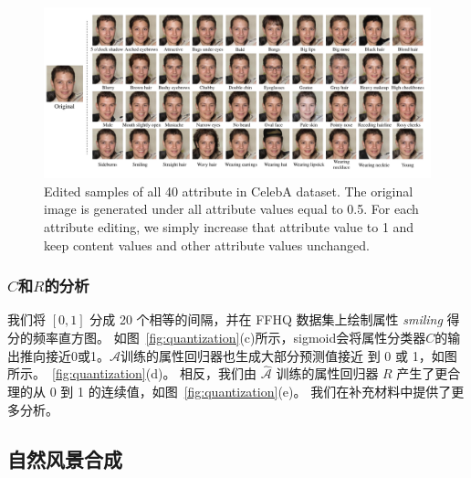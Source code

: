 \begin{figure}[!t]
    \begin{center}
       \includegraphics[width=0.9\linewidth]{figures/ACGAN/40Attributes.pdf}
    \end{center}
    \caption{Edited samples of all 40 attribute in CelebA dataset. The original image is generated under all attribute values equal to 0.5. For each attribute editing, we simply increase that attribute value to 1 and keep content values and other attribute values unchanged.}
    \label{fig:40Attributes}
\end{figure}

\subsubsection{$C$和$R$的分析}
我们将 $[0,1]$ 分成 20 个相等的间隔，并在 FFHQ 数据集上绘制属性 \textit{smiling} 得分的频率直方图。 如图~\ref{fig:quantization}(c)所示，sigmoid会将属性分类器$C$的输出推向接近0或1。$\mathcal{A}$训练的属性回归器也生成大部分预测值接近 到 0 或 1，如图所示。~\ref{fig:quantization}(d)。 相反，我们由 $\hat{\mathcal{A}}$ 训练的属性回归器 $R$ 产生了更合理的从 0 到 1 的连续值，如图~\ref{fig:quantization}(e)。 我们在补充材料中提供了更多分析。

\subsection{自然风景合成}

